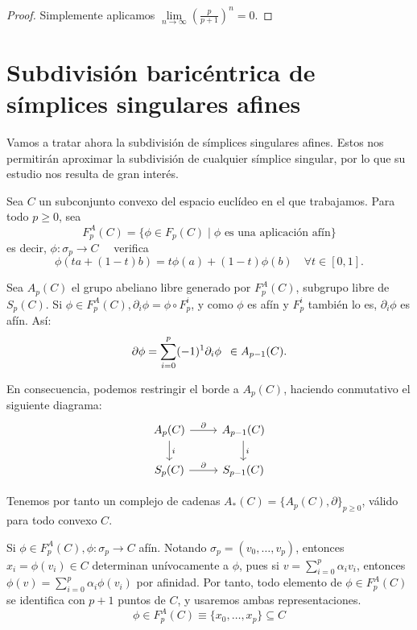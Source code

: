 \begin{proof}
  Simplemente aplicamos $\lim\limits_{n \to \infty}(\frac{p}{p+1})^n = 0$.
\end{proof}

\section{Subdivisión baricéntrica de símplices singulares afines}

Vamos a tratar ahora la subdivisión de símplices singulares afines. Estos nos permitirán aproximar la
subdivisión de cualquier símplice singular, por lo que su estudio nos resulta de gran interés.

Sea $C$ un subconjunto convexo del espacio euclídeo en el que trabajamos. Para todo $p \geq 0$, sea
\[F_p^A(C) = \{ \phi \in F_p(C) \mid \phi \text{ es una aplicación afín}\} \]
es decir, $\phi \colon \sigma_p \to C \quad$ verifica \[\phi(ta + (1-t)b) = t\phi(a) + (1-t)\phi(b) \hspace{1em} \forall t \in [0,1].\]

Sea $A_p(C)$ el grupo abeliano libre generado por $F_p^A(C)$, subgrupo libre de $S_p(C)$. Si $\phi \in F_p^A(C), \partial_i \phi = \phi \circ F_p^i$,
y como $\phi$ es afín y $F_p^i$ también lo es, $\partial_i \phi$ es afín. Así:
\[\partial \phi = \sum\limits_{i = 0}^p (-1)^1 \partial_i \phi \hspace{0.5em} \in A_{p-1}(C).\]

En consecuencia, podemos restringir el borde a $A_p(C)$, haciendo conmutativo el siguiente diagrama:
\[ \begin{tikzcd}
      A_p(C) \arrow{r}{\partial} \arrow{d}{i} & A_{p-1}(C) \arrow{d}{i} \\
      S_p(C) \arrow{r}{\partial} & S_{p-1}(C)
\end{tikzcd} \]

Tenemos por tanto un complejo de cadenas $A_*(C) = \{A_p(C), \partial\}_{p \geq 0}$, válido para todo convexo $C$.

Si $\phi \in F_p^A(C), \phi \colon \sigma_p \to C$ afín. Notando $\sigma_p = (v_0, \dots, v_p)$, entonces
${x_i = \phi(v_i) \in C}$ determinan unívocamente a $\phi$, pues si $v = \sum\limits_{i = 0}^p \alpha_i v_i$, entonces
$\phi(v) = \sum\limits_{i = 0}^p \alpha_i \phi(v_i)$ por afinidad. Por tanto, todo elemento de $\phi \in F_p^A(C)$ se
identifica con $p+1$ puntos de $C$, y usaremos ambas representaciones.
\[\phi \in F_p^A(C) \equiv \{x_0, \dots, x_p\} \subseteq C\]

